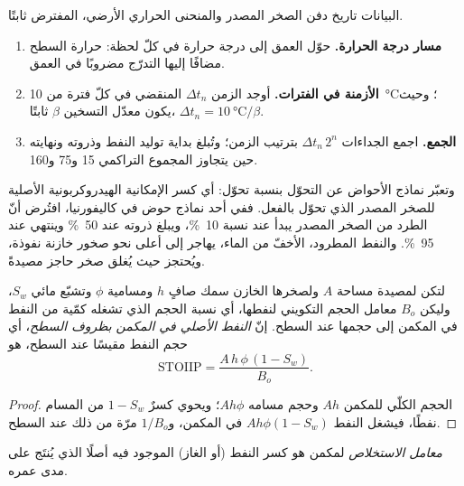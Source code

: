 \begin{method}\label{met:b2:energy-geology:tti}
البيانات تاريخ دفن الصخر المصدر والمنحنى الحراري الأرضي، المفترض ثابتًا.
\begin{enumerate}
  \item \textbf{مسار درجة الحرارة.} حوّل العمق إلى درجة حرارة في كلّ لحظة: حرارة السطح
        مضافًا إليها التدرّج مضروبًا في العمق.
  \item \textbf{الأزمنة في الفترات.} أوجد الزمن $\Delta t_n$ المنقضي في كلّ فترة من
        \qty{10}{\celsius}؛ وحيث يكون معدّل التسخين $\beta$ ثابتًا، $\Delta t_n = \qty{10}{\celsius}/\beta$.
  \item \textbf{الجمع.} اجمع الجداءات $\Delta t_n\,2^n$ بترتيب الزمن؛ وتُبلغ بداية توليد النفط وذروته
        ونهايته حين يتجاوز المجموع التراكمي 15 و75 و160.
\end{enumerate}
\end{method}

وتعبّر نماذج الأحواض عن التحوّل بنسبة تحوّل: أي كسر الإمكانية الهيدروكربونية
الأصلية للصخر المصدر الذي تحوّل بالفعل. ففي أحد نماذج حوض في كاليفورنيا،
افتُرض أنّ الطرد من الصخر المصدر يبدأ عند نسبة \qty{10}{\percent}، ويبلغ ذروته عند
\qty{50}{\percent} وينتهي عند \qty{95}{\percent}. والنفط المطرود، الأخفّ من الماء،
يهاجر إلى أعلى نحو صخور خازنة نفوذة، ويُحتجز حيث يُغلق صخر حاجز مصيدةً.

\begin{proposition}\label{prop:b2:energy-geology:volumetrics}
لتكن لمصيدة مساحة $A$ ولصخرها الخازن سمك صافٍ $h$ ومسامية $\phi$ وتشبّع مائي
$S_w$، وليكن $B_o$ معامل الحجم التكويني لنفطها، أي نسبة الحجم الذي تشغله كمّية
من النفط في المكمن إلى حجمها عند السطح. إنّ \emph{النفط الأصلي في المكمن بظروف السطح}،
أي حجم النفط مقيسًا عند السطح، هو
\begin{equation}
\mathrm{STOIIP} = \frac{A\,h\,\phi\,(1 - S_w)}{B_o} .
\label{eq:b2:energy-geology:stoiip}
\end{equation}
\end{proposition}

\begin{proof}
الحجم الكلّي للمكمن $Ah$ وحجم مسامه $Ah\phi$؛ ويحوي كسرٌ $1 - S_w$ من
المسام نفطًا، فيشغل النفط $Ah\phi(1 - S_w)$ في المكمن، و$1/B_o$ مرّة من ذلك عند
السطح.
\end{proof}

\begin{definition}\label{def:b2:energy-geology:volumetrics}
\emph{معامل الاستخلاص} لمكمن هو كسر النفط (أو الغاز)
الموجود فيه أصلًا الذي يُنتَج على مدى عمره.
\end{definition}

